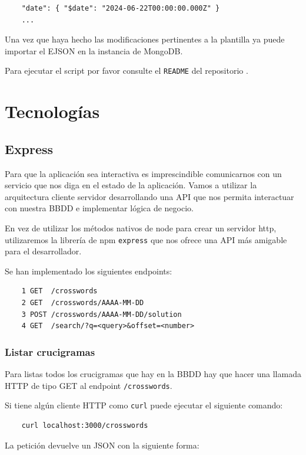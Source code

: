 \documentclass[12pt, a4paper]{article}
\begin{document}
\begin{verbatim}
	"date": { "$date": "2024-06-22T00:00:00.000Z" }
	...
\end{verbatim}

Una vez que haya hecho las modificaciones pertinentes a la plantilla ya puede importar el
EJSON en la instancia de MongoDB.

Para ejecutar el script por favor consulte el \verb*|README| del
repositorio \cite{repositorio}.


\section{Tecnologías}

\subsection{Express}

Para que la aplicación sea interactiva es imprescindible comunicarnos con un servicio 
que nos diga en el estado de la aplicación. Vamos a utilizar la arquitectura cliente
servidor desarrollando una API que nos permita interactuar con nuestra BBDD e implementar
lógica de negocio. 

En vez de utilizar los métodos nativos de node para crear un servidor http, utilizaremos
la librería de npm \verb*|express| que nos ofrece una API más amigable para el desarrollador.

Se han implementado los siguientes endpoints:

\begin{verbatim}
	1 GET  /crosswords
	2 GET  /crosswords/AAAA-MM-DD
	3 POST /crosswords/AAAA-MM-DD/solution
	4 GET  /search/?q=<query>&offset=<number>
\end{verbatim}

\subsubsection{Listar crucigramas}

Para listas todos los crucigramas que hay en la BBDD hay que hacer una llamada
HTTP de tipo GET al endpoint \verb*|/crosswords|.

Si tiene algún cliente HTTP como \verb*|curl| puede ejecutar el siguiente
comando:

\begin{verbatim}
	curl localhost:3000/crosswords
\end{verbatim}

La petición devuelve un JSON con la siguiente forma:
\end{document}
